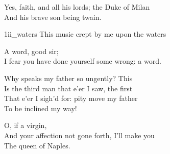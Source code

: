 	
\begin{verse_speech}[Ferdinand] 
Yes, faith, and all his lords; the Duke of Milan\\
And his brave son being twain.
\end{verse_speech}


\begin{pictures} %
	\begin{a4}
		\begin{colorbigpic}
			[1.0]
			{1ii_waters}
			{This music crept by me upon the waters}
		\end{colorbigpic}
	\end{a4}
\end{pictures}



\begin{verse_speech}[Prospero] 
A word, good sir;\\
I fear you have done yourself some wrong: a word.
\end{verse_speech}

\begin{verse_speech}[Miranda] 
Why speaks my father so ungently? This\\
Is the third man that e'er I saw, the first\\
That e'er I sigh'd for: pity move my father\\
To be inclined my way!
\end{verse_speech}

\begin{verse_speech}[Ferdinand] 
O, if a virgin,\\
And your affection not gone forth, I'll make you\\
The queen of Naples.
\end{verse_speech}


